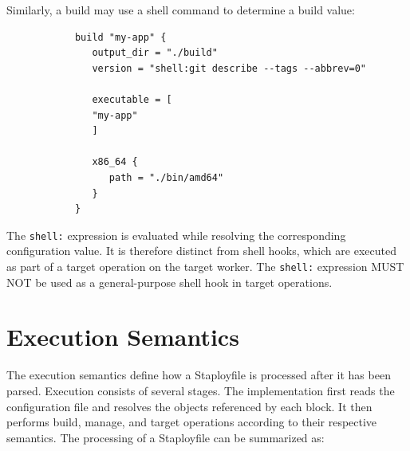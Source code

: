 \documentclass[11pt,a4paper]{article}
\begin{document}
    Similarly, a build may use a shell command to determine a build value:

    \begin{center}
        \begin{verbatim}
            build "my-app" {
               output_dir = "./build"
               version = "shell:git describe --tags --abbrev=0"

               executable = [
               "my-app"
               ]

               x86_64 {
                  path = "./bin/amd64"
               }
            }
        \end{verbatim}
    \end{center}

    The \texttt{shell:} expression is evaluated while resolving the corresponding configuration value.
    It is therefore distinct from shell hooks, which are executed as part of a target operation on the target worker.
    The \texttt{shell:} expression MUST NOT be used as a general-purpose shell hook in target operations.


    \section{Execution Semantics}\label{sec:execution-semantics}

    The execution semantics define how a Staployfile is processed after it has been parsed.
    Execution consists of several stages.
    The implementation first reads the configuration file and resolves the objects referenced by each block.
    It then performs build, manage, and target operations according to their respective semantics.
    The processing of a Staployfile can be summarized as:

    \begin{center}
    \end{center}
\end{document}
